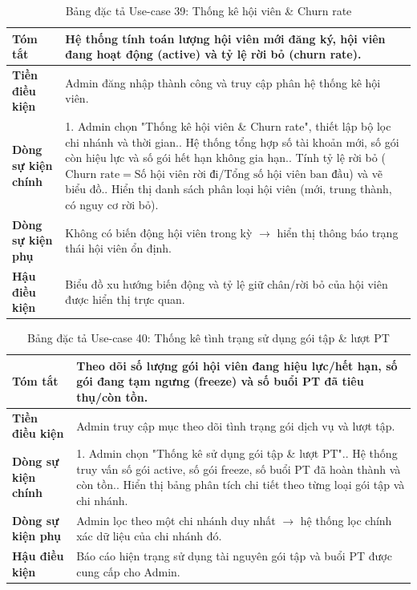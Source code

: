 \documentclass[a4paper,12pt]{article}
\begin{document}
\begin{table}[H]\centering\footnotesize
\begin{tabularx}{\textwidth}{|L{3.2cm}|Y|}
\hline \textbf{Tóm tắt} & Hệ thống tính toán lượng hội viên mới đăng ký, hội viên đang hoạt động (active) và tỷ lệ rời bỏ (churn rate). \\ \hline
\textbf{Tiền điều kiện} & Admin đăng nhập thành công và truy cập phân hệ thống kê hội viên. \\ \hline
\textbf{Dòng sự kiện chính} & 1. Admin chọn "Thống kê hội viên \& Churn rate", thiết lập bộ lọc chi nhánh và thời gian.. Hệ thống tổng hợp số tài khoản mới, số gói còn hiệu lực và số gói hết hạn không gia hạn.. Tính tỷ lệ rời bỏ ($\text{Churn rate} = \text{Số hội viên rời đi} / \text{Tổng số hội viên ban đầu}$) và vẽ biểu đồ.. Hiển thị danh sách phân loại hội viên (mới, trung thành, có nguy cơ rời bỏ). \\ \hline
\textbf{Dòng sự kiện phụ} & Không có biến động hội viên trong kỳ $\rightarrow$ hiển thị thông báo trạng thái hội viên ổn định. \\ \hline
\textbf{Hậu điều kiện} & Biểu đồ xu hướng biến động và tỷ lệ giữ chân/rời bỏ của hội viên được hiển thị trực quan. \\ \hline
\end{tabularx}
\caption{Bảng đặc tả Use-case 39: Thống kê hội viên \& Churn rate}
\end{table}

\begin{table}[H]\centering\footnotesize
\begin{tabularx}{\textwidth}{|L{3.2cm}|Y|}
\hline \textbf{Tóm tắt} & Theo dõi số lượng gói hội viên đang hiệu lực/hết hạn, số gói đang tạm ngưng (freeze) và số buổi PT đã tiêu thụ/còn tồn. \\ \hline
\textbf{Tiền điều kiện} & Admin truy cập mục theo dõi tình trạng gói dịch vụ và lượt tập. \\ \hline
\textbf{Dòng sự kiện chính} & 1. Admin chọn "Thống kê sử dụng gói tập \& lượt PT".. Hệ thống truy vấn số gói active, số gói freeze, số buổi PT đã hoàn thành và còn tồn.. Hiển thị bảng phân tích chi tiết theo từng loại gói tập và chi nhánh. \\ \hline
\textbf{Dòng sự kiện phụ} & Admin lọc theo một chi nhánh duy nhất $\rightarrow$ hệ thống lọc chính xác dữ liệu của chi nhánh đó. \\ \hline
\textbf{Hậu điều kiện} & Báo cáo hiện trạng sử dụng tài nguyên gói tập và buổi PT được cung cấp cho Admin. \\ \hline
\end{tabularx}
\caption{Bảng đặc tả Use-case 40: Thống kê tình trạng sử dụng gói tập \& lượt PT}
\end{table}
\end{document}
